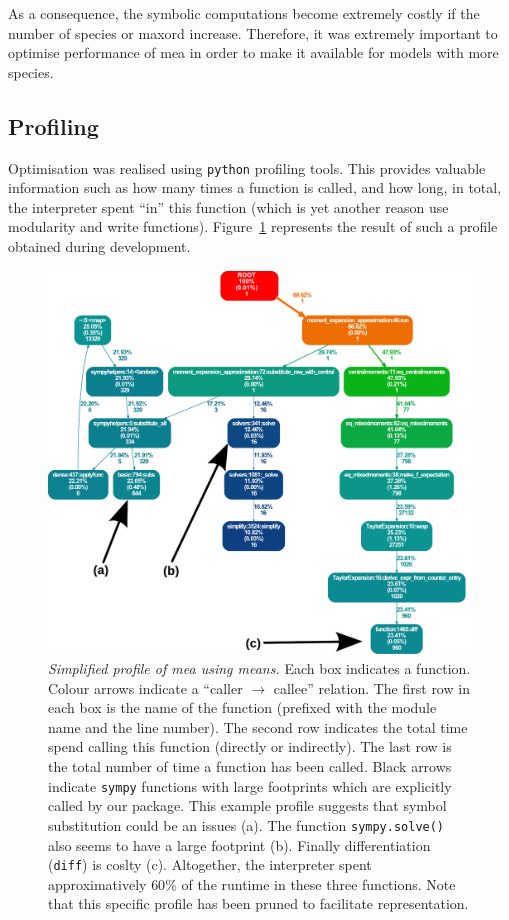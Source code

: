 \documentclass[11pt,a4paper]{article}
\newcommand{\py}{\texttt{python}}
\newcommand{\sympy}{\texttt{sympy}}
\begin{document}
As a consequence, the symbolic computations become extremely costly if the number of species or \gls{maxord} increase.
Therefore, it was extremely important to optimise performance of \gls{mea} in order to make it available for models with more species.

\subsection{Profiling}
Optimisation was realised using \py{} profiling tools.
This provides valuable information such as how many times a function is called, and how long, in total,
the interpreter spent ``in'' this function (which is yet another reason use modularity and write functions).
Figure~\ref{fig:profile} represents the result of such a profile obtained during development.


\begin{figure}[tbh]
\includegraphics[width=0.95\textwidth{}]{profile.pdf}
\caption{\emph{Simplified profile of \gls{mea} using means.}
Each box indicates a function. 
Colour arrows indicate a ``caller $ \rightarrow $ callee'' relation.
The first row in each box is the name of the function (prefixed with the module name and the line number).
The second row indicates the total time spend calling this function (directly or indirectly).
The last row is the total number of time a function has been called.
Black arrows indicate \sympy{} functions with large footprints which are explicitly called by our package.
This example profile suggests that symbol substitution could be an issues (a). 
The function \texttt{sympy.solve()} also seems to have a large footprint (b).
Finally differentiation (\texttt{diff}) is coslty (c).
Altogether, the interpreter spent approximatively $60\%$ 
of the runtime in these three functions. 
Note that this specific profile has been pruned to facilitate representation. 
}

\label{fig:profile}
\end{figure}
\end{document}
